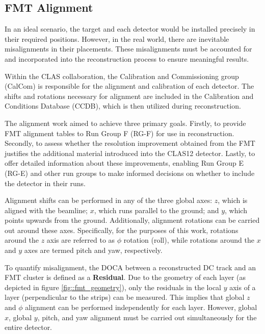 \subsection{FMT Alignment}
\label{ssec::fmt_alignment}
    In an ideal scenario, the target and each detector would be installed precisely in their required positions.
    However, in the real world, there are inevitable misalignments in their placements.
    These misalignments must be accounted for and incorporated into the reconstruction process to ensure meaningful results.

    Within the CLAS collaboration, the Calibration and Commissioning group (CalCom) is responsible for the alignment and calibration of each detector.
    The shifts and rotations necessary for alignment are included in the Calibration and Conditions Database (CCDB), which is then utilized during reconstruction.

    The alignment work aimed to achieve three primary goals.
    Firstly, to provide FMT alignment tables to Run Group F (RG-F) for use in reconstruction.
    Secondly, to assess whether the resolution improvement obtained from the FMT justifies the additional material introduced into the CLAS12 detector.
    Lastly, to offer detailed information about these improvements, enabling Run Group E (RG-E) and other run groups to make informed decisions on whether to include the detector in their runs.

    Alignment shifts can be performed in any of the three global axes: $z$, which is aligned with the beamline; $x$, which runs parallel to the ground; and $y$, which points upwards from the ground.
    Additionally, alignment rotations can be carried out around these axes.
    Specifically, for the purposes of this work, rotations around the $z$ axis are referred to as $\phi$ rotation (roll), while rotations around the $x$ and $y$ axes are termed pitch and yaw, respectively.

    To quantify misalignment, the DOCA between a reconstructed DC track and an FMT cluster is defined as a \textbf{Residual}.
    Due to the geometry of each layer (as depicted in figure \ref{fig::fmt_geometry}), only the residuals in the local $y$ axis of a layer (perpendicular to the strips) can be measured.
    This implies that global $z$ and $\phi$ alignment can be performed independently for each layer.
    However, global $x$, global $y$, pitch, and yaw alignment must be carried out simultaneously for the entire detector.

